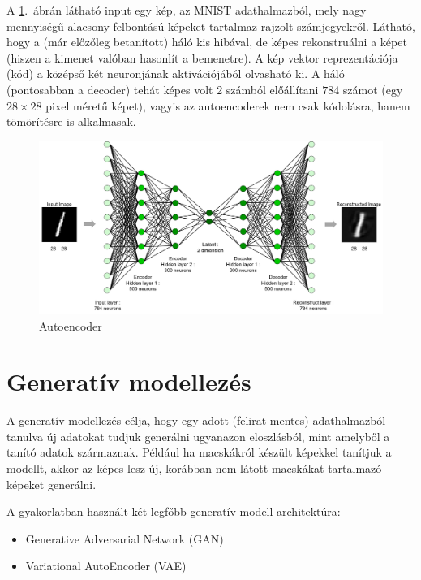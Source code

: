 A \ref{AE_arch2}.~ábrán látható input egy kép, az MNIST adathalmazból, mely nagy mennyiségű alacsony felbontású képeket tartalmaz rajzolt számjegyekről. Látható, hogy a (már előzőleg betanított) háló kis hibával, de képes rekonstruálni a képet (hiszen a kimenet valóban hasonlít a bemenetre). A kép vektor reprezentációja (kód) a középső két neuronjának aktivációjából olvasható ki. A háló (pontosabban a decoder) tehát képes volt 2 számból előállítani $784$ számot (egy $28\times 28$ pixel méretű képet), vagyis az autoencoderek nem csak kódolásra, hanem tömörítésre is alkalmasak.

\begin{figure}[h!]
\begin{center}
  
 
 \begin{center}
	\includegraphics[width=\linewidth]{AE_arch2.png}
 \end{center}

  \caption{Autoencoder}\label{AE_arch2}
\end{center}
\end{figure}

\section{Generatív modellezés}

A generatív modellezés célja, hogy egy adott (felirat mentes) adathalmazból tanulva új adatokat tudjuk generálni ugyanazon eloszlásból, mint amelyből a tanító adatok származnak. Például ha macskákról készült képekkel tanítjuk a modellt, akkor az képes lesz új, korábban nem látott macskákat tartalmazó képeket generálni.

A gyakorlatban használt két legfőbb generatív modell architektúra:
\begin{itemize}
  \item Generative Adversarial Network (GAN)
  \item Variational AutoEncoder (VAE)
\end{itemize}

